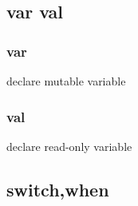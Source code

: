 \documentclass{article}
\begin{document}
    \subsection{var val}
         \subsubsection{var}
            declare mutable variable
         \subsubsection{val}
            declare read-only variable
    \subsection{switch,when}
         
\end{document}
